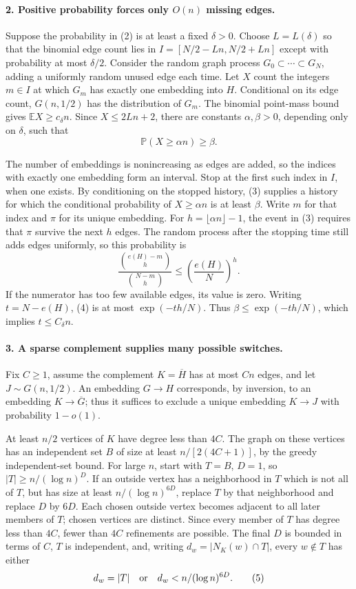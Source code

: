\paragraph{2. Positive probability forces only \(O(n)\) missing edges.}
Suppose the probability in (2) is at least a fixed \(\delta>0\).
Choose \(L=L(\delta)\) so that the binomial edge count lies in
\(I=[N/2-Ln,N/2+Ln]\) except with probability at most \(\delta/2\).
Consider the random graph process \(G_0\subset\cdots\subset G_N\),
adding a uniformly random unused edge each time.
Let \(X\) count the integers \(m\in I\) at which \(G_m\) has exactly
one embedding into \(H\). Conditional on its edge count, \(G(n,1/2)\)
has the distribution of \(G_m\). The binomial point-mass bound gives
\(\mathbb EX\geq c_\delta n\). Since \(X\leq2Ln+2\), there are
constants \(\alpha,\beta>0\), depending only on \(\delta\), such that
\[
 \mathbb P(X\geq\alpha n)\geq\beta.
 \tag{3}
\]

The number of embeddings is nonincreasing as edges are added, so the
indices with exactly one embedding form an interval. Stop at the first
such index in \(I\), when one exists. By conditioning on the stopped
history, (3) supplies a history for which the conditional probability
of \(X\geq\alpha n\) is at least \(\beta\).
Write \(m\) for that index and \(\pi\) for its unique embedding.
For \(h=\lfloor\alpha n\rfloor-1\), the event in (3) requires that
\(\pi\) survive the next \(h\) edges. The random process after the
stopping time still adds edges uniformly, so this probability is
\[
 \frac{\binom{e(H)-m}{h}}{\binom{N-m}{h}}
 \leq\left(\frac{e(H)}N\right)^h.
 \tag{4}
\]
If the numerator has too few available edges, its value is zero.
Writing \(t=N-e(H)\), (4) is at most \(\exp(-th/N)\).
Thus \(\beta\leq\exp(-th/N)\), which implies \(t\leq C_\delta n\).

\paragraph{3. A sparse complement supplies many possible switches.}
Fix \(C\geq1\), assume the complement \(K=\overline H\) has at most
\(Cn\) edges, and let \(J\sim G(n,1/2)\).
An embedding \(G\to H\) corresponds, by inversion, to an embedding
\(K\to\overline G\); thus it suffices to exclude a unique embedding
\(K\to J\) with probability \(1-o(1)\).

At least \(n/2\) vertices of \(K\) have degree less than \(4C\).
The graph on these vertices has an independent set \(B\) of size at
least \(n/[2(4C+1)]\), by the greedy independent-set bound.
For large \(n\), start with \(T=B\), \(D=1\), so
\(|T|\geq n/(\log n)^D\).
If an outside vertex has a neighborhood in \(T\) which is not all of
\(T\), but has size at least \(n/(\log n)^{6D}\), replace \(T\) by
that neighborhood and replace \(D\) by \(6D\).
Each chosen outside vertex becomes adjacent to all later members of
\(T\); chosen vertices are distinct. Since every member of \(T\)
has degree less than \(4C\), fewer than \(4C\) refinements are possible.
The final \(D\) is bounded in terms of \(C\), \(T\) is independent,
and, writing \(d_w=|N_K(w)\cap T|\), every \(w\notin T\) has either
\[
 d_w=|T|\quad\hbox{or}\quad d_w<n/(\log n)^{6D}.
 \tag{5}
\]

